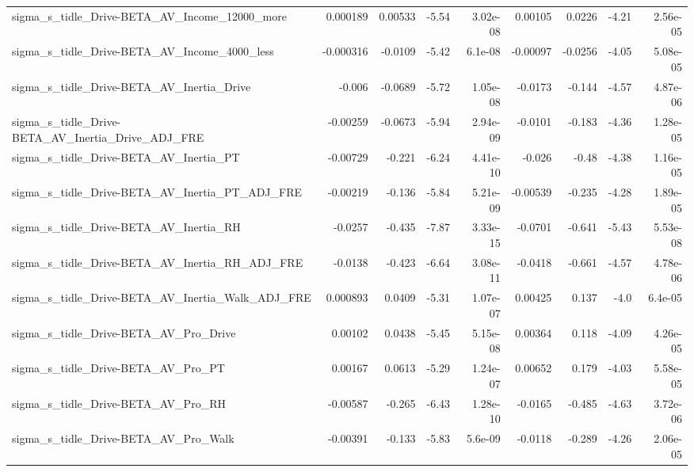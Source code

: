 \begin{tabular}{lrrrrrrrr}
sigma\_s\_tidle\_Drive-BETA\_AV\_Income\_12000\_more      &    0.000189 &      0.00533 &    -5.54 & 3.02e-08 &    0.00105 &      0.0226 &        -4.21 &      2.56e-05 \\
sigma\_s\_tidle\_Drive-BETA\_AV\_Income\_4000\_less       &   -0.000316 &      -0.0109 &    -5.42 &  6.1e-08 &   -0.00097 &     -0.0256 &        -4.05 &      5.08e-05 \\
sigma\_s\_tidle\_Drive-BETA\_AV\_Inertia\_Drive          &      -0.006 &      -0.0689 &    -5.72 & 1.05e-08 &    -0.0173 &      -0.144 &        -4.57 &      4.87e-06 \\
sigma\_s\_tidle\_Drive-BETA\_AV\_Inertia\_Drive\_ADJ\_FRE  &    -0.00259 &      -0.0673 &    -5.94 & 2.94e-09 &    -0.0101 &      -0.183 &        -4.36 &      1.28e-05 \\
sigma\_s\_tidle\_Drive-BETA\_AV\_Inertia\_PT             &    -0.00729 &       -0.221 &    -6.24 & 4.41e-10 &     -0.026 &       -0.48 &        -4.38 &      1.16e-05 \\
sigma\_s\_tidle\_Drive-BETA\_AV\_Inertia\_PT\_ADJ\_FRE     &    -0.00219 &       -0.136 &    -5.84 & 5.21e-09 &   -0.00539 &      -0.235 &        -4.28 &      1.89e-05 \\
sigma\_s\_tidle\_Drive-BETA\_AV\_Inertia\_RH             &     -0.0257 &       -0.435 &    -7.87 & 3.33e-15 &    -0.0701 &      -0.641 &        -5.43 &      5.53e-08 \\
sigma\_s\_tidle\_Drive-BETA\_AV\_Inertia\_RH\_ADJ\_FRE     &     -0.0138 &       -0.423 &    -6.64 & 3.08e-11 &    -0.0418 &      -0.661 &        -4.57 &      4.78e-06 \\
sigma\_s\_tidle\_Drive-BETA\_AV\_Inertia\_Walk\_ADJ\_FRE   &    0.000893 &       0.0409 &    -5.31 & 1.07e-07 &    0.00425 &       0.137 &         -4.0 &       6.4e-05 \\
sigma\_s\_tidle\_Drive-BETA\_AV\_Pro\_Drive              &     0.00102 &       0.0438 &    -5.45 & 5.15e-08 &    0.00364 &       0.118 &        -4.09 &      4.26e-05 \\
sigma\_s\_tidle\_Drive-BETA\_AV\_Pro\_PT                 &     0.00167 &       0.0613 &    -5.29 & 1.24e-07 &    0.00652 &       0.179 &        -4.03 &      5.58e-05 \\
sigma\_s\_tidle\_Drive-BETA\_AV\_Pro\_RH                 &    -0.00587 &       -0.265 &    -6.43 & 1.28e-10 &    -0.0165 &      -0.485 &        -4.63 &      3.72e-06 \\
sigma\_s\_tidle\_Drive-BETA\_AV\_Pro\_Walk               &    -0.00391 &       -0.133 &    -5.83 &  5.6e-09 &    -0.0118 &      -0.289 &        -4.26 &      2.06e-05 \\

\end{tabular}
